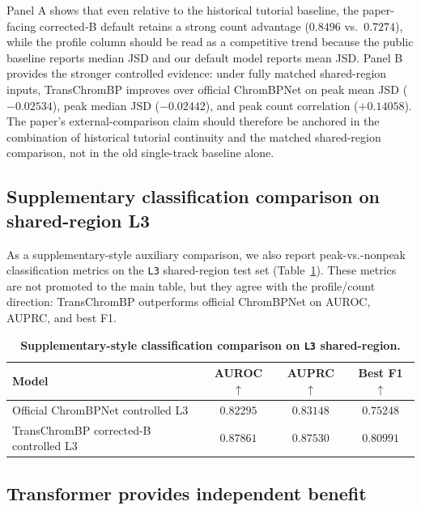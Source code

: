 \documentclass[11pt,a4paper]{article}
\begin{document}
\noindent Panel A shows that even relative to the historical tutorial
baseline, the paper-facing corrected-B default retains a strong count
advantage ($0.8496$ vs.\ $0.7274$), while the profile column should be
read as a competitive trend because the public baseline reports median
JSD and our default model reports mean JSD. Panel B provides the
stronger controlled evidence: under fully matched shared-region inputs,
TransChromBP improves over official ChromBPNet on peak mean JSD
($-0.02534$), peak median JSD ($-0.02442$), and peak count correlation
($+0.14058$). The paper's external-comparison claim should therefore be
anchored in the combination of historical tutorial continuity and the
matched shared-region comparison, not in the old single-track baseline
alone.

\subsection{Supplementary classification comparison on shared-region L3}
\label{sec:l3-classification}

As a supplementary-style auxiliary comparison, we also report
peak-vs.-nonpeak classification metrics on the \texttt{L3} shared-region test
set (Table~\ref{tab:l3-classification}). These metrics are not promoted
to the main table, but they agree with the profile/count direction:
TransChromBP outperforms official ChromBPNet on AUROC, AUPRC, and best
F1.

\begin{table}[H]
\centering
\small
\caption{\textbf{Supplementary-style classification comparison on \texttt{L3}
shared-region.}}
\label{tab:l3-classification}
\begin{tabular}{lccc}
\toprule
Model & AUROC $\uparrow$ & AUPRC $\uparrow$ & Best F1 $\uparrow$ \\
\midrule
Official ChromBPNet controlled L3 & $0.82295$ & $0.83148$ & $0.75248$ \\
TransChromBP corrected-B controlled L3 & $\mathbf{0.87861}$ & $\mathbf{0.87530}$ & $\mathbf{0.80991}$ \\
\bottomrule
\end{tabular}
\end{table}

\subsection{Transformer provides independent benefit}
\label{sec:tf-ablation}
\end{document}
